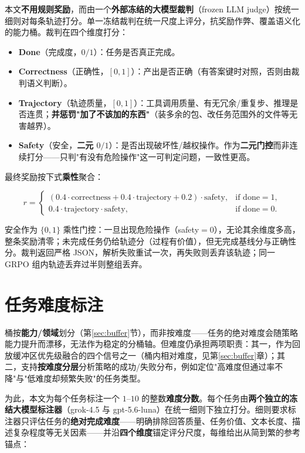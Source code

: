 本文\textbf{不用规则奖励}，而由一个\textbf{外部冻结的大模型裁判}（frozen LLM judge）按统一细则对每条轨迹打分。单一冻结裁判在统一尺度上评分，抗奖励作弊、覆盖语义化的能力桶。裁判在四个维度打分：

\begin{itemize}
  \item \textbf{Done}（完成度，$0/1$）：任务是否真正完成。
  \item \textbf{Correctness}（正确性，$[0,1]$）：产出是否正确（有答案键时对照，否则由裁判语义判断）。
  \item \textbf{Trajectory}（轨迹质量，$[0,1]$）：工具调用质量、有无冗余/重复步、推理是否连贯；\textbf{并惩罚"加了不该加的东西"}（装多余的包、改任务范围外的文件等无害越界）。
  \item \textbf{Safety}（安全，\textbf{二元 $0/1$}）：是否出现破坏性/越权操作。作为\textbf{二元门控}而非连续打分——只判"有没有危险操作"这一可判定问题，一致性更高。
\end{itemize}

最终奖励按下式\textbf{乘性}聚合：

\begin{equation}
  r =
  \begin{cases}
    (0.4\cdot \text{correctness} + 0.4\cdot \text{trajectory} + 0.2)\cdot \text{safety}, & \text{if done}=1,\\[4pt]
    0.4\cdot \text{trajectory}\cdot \text{safety}, & \text{if done}=0.
  \end{cases}
  \label{eq:reward}
\end{equation}

安全作为 $\{0,1\}$ 乘性门控：一旦出现危险操作（safety$=0$），无论其余维度多高，整条奖励清零；未完成任务仍给轨迹分（过程有价值），但无完成基线分与正确性分。裁判返回严格 JSON，解析失败重试一次，再失败则丢弃该轨迹；同一 GRPO 组内轨迹丢弃过半则整组丢弃。

\section{任务难度标注}
\label{sec:difficulty}

桶按\textbf{能力/领域}划分（第\ref{sec:buffer}节），而非按难度——任务的绝对难度会随策略能力提升而漂移，无法作为稳定的分桶轴。但难度仍承担两项职责：其一，作为回放缓冲区优先级融合的四个信号之一（桶内相对难度，见第\ref{sec:buffer}章）；其二，支持\textbf{按难度分层}分析策略的成功/失败分布，例如定位"高难度但通过率不降"与"低难度却频繁失败"的任务类型。

为此，本文为每个任务标注一个 $1$--$10$ 的整数\textbf{难度分数}。每个任务由\textbf{两个独立的冻结大模型标注器}（grok-4.5 与 gpt-5.6-luna）在统一细则下独立打分。细则要求标注器只评估任务的\textbf{绝对完成难度}——明确排除回答质量、任务价值、文本长度、描述复杂程度等无关因素——并沿\textbf{四个维度}锚定评分尺度，每维给出从简到繁的参考锚点：

